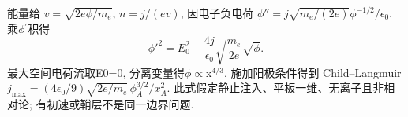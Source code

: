 \begin{solution}
能量给 $v=\sqrt{2e\phi/m_e}$, $n=j/(ev)$, 因电子负电荷 $\phi''=j\sqrt{m_e/(2e)}\phi^{-1/2}/\epsilon_0$. 乘\ensuremath{\phi}\ensuremath{{}^{\prime}}积得
\begin{equation}
 \phi'^2=E_0^2+\frac{4j}{\epsilon_0}\sqrt{\frac{m_e}{2e}}\sqrt\phi.
\end{equation}
最大空间电荷流取E0=0, 分离变量得\ensuremath{\phi}\ensuremath{\propto}x$^{4/3}$, 施加阳极条件得到 Child--Langmuir
$j_{\max}=(4\epsilon_0/9)\sqrt{2e/m_e}\,\phi_A^{3/2}/x_A^2$. 此式假定静止注入、平板一维、无离子且非相对论; 有初速或鞘层不是同一边界问题.
\end{solution}
